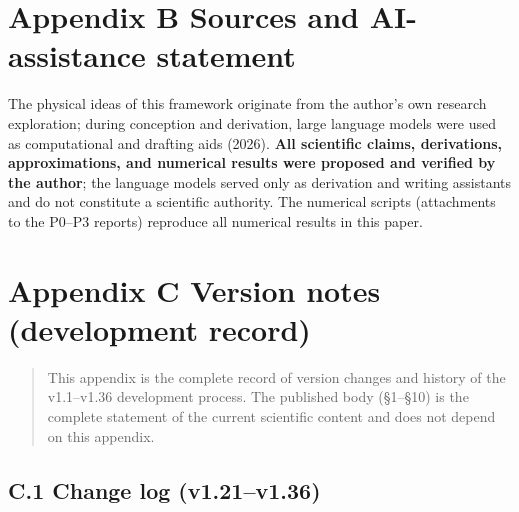 \documentclass[12pt]{article}
\begin{document}
\section*{Appendix B Sources and AI-assistance statement}

The physical ideas of this framework originate from the author's own research exploration; during conception and derivation, large language models were used as computational and drafting aids (2026). \textbf{All scientific claims, derivations, approximations, and numerical results were proposed and verified by the author}; the language models served only as derivation and writing assistants and do not constitute a scientific authority. The numerical scripts (attachments to the P0--P3 reports) reproduce all numerical results in this paper.



\section*{Appendix C Version notes (development record)}

\begin{quote}
This appendix is the complete record of version changes and history of the v1.1--v1.36 development process. The published body (\S{}1--\S{}10) is the complete statement of the current scientific content and does not depend on this appendix.
\end{quote}

\subsection*{C.1 Change log (v1.21--v1.36)}
\end{document}
